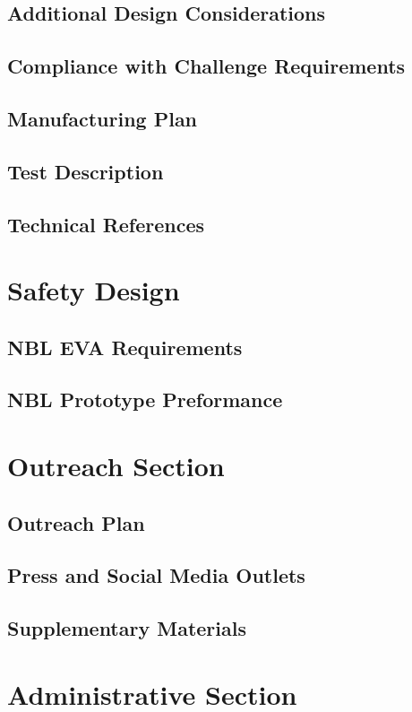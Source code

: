 \documentclass{article}
\begin{document}
\subsection{Additional Design Considerations}
\subsection{Compliance with Challenge Requirements}
\subsection{Manufacturing Plan}
\subsection{Test Description}
\subsection{Technical References}


\section{Safety Design}
\subsection{NBL EVA Requirements}
\subsection{NBL Prototype Preformance}
\section{Outreach Section}
\subsection{Outreach Plan}
\subsection{Press and Social Media Outlets}
\subsection{Supplementary Materials}


\section{Administrative Section}
\end{document}
